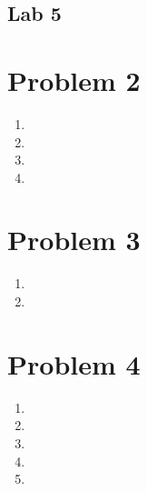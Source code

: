 \documentclass[11pt, oneside]{article}   	%
\begin{document}
\begin{center}
\section*{Lab 5}
\end{center}

\begin{flushleft}



\newpage
\section*{Problem 2}
\begin{enumerate}
    \item %
    \item %
    \item %
    \item %
\end{enumerate}
\newpage
\section*{Problem 3}
\begin{enumerate}
    \item %
    \item %
\end{enumerate}
\newpage
\section*{Problem 4}
\begin{enumerate}
    \item %
    \item %
    \item %
    \item %
    \item %
\end{enumerate}
\end{flushleft}
\end{document}
